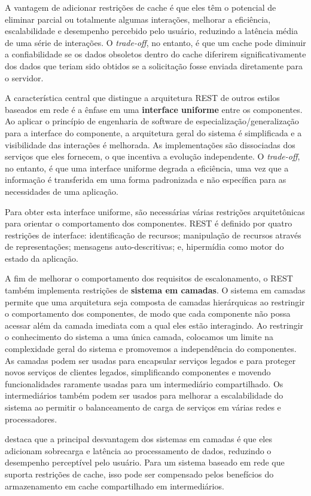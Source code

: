 A vantagem de adicionar restrições de cache é que eles têm o potencial de eliminar parcial ou totalmente algumas interações, melhorar a eficiência, escalabilidade e desempenho percebido pelo usuário, reduzindo a latência média de uma série de interações. O \textit{trade-off}, no entanto, é que um cache pode diminuir a confiabilidade se os dados obsoletos dentro do cache diferirem significativamente dos dados que teriam sido obtidos se a solicitação fosse enviada diretamente para o servidor.

A característica central que distingue a arquitetura REST de outros estilos baseados em rede é a ênfase em uma \textbf{interface uniforme} entre os componentes. Ao aplicar o princípio de engenharia de software de especialização/generalização para a interface do componente, a arquitetura geral do sistema é simplificada e a visibilidade das interações é melhorada. As implementações são dissociadas dos serviços que eles fornecem, o que incentiva a evolução independente. O \textit{trade-off}, no entanto, é que uma interface uniforme degrada a eficiência, uma vez que a informação é transferida em uma forma padronizada e não específica para as necessidades de uma aplicação.

Para obter esta interface uniforme, são necessárias várias restrições arquitetônicas para orientar o comportamento dos componentes. REST é definido por quatro restrições de interface: identificação de recursos; manipulação de recursos através de representações; mensagens auto-descritivas; e, hipermídia como motor do estado da aplicação.

A fim de melhorar o comportamento dos requisitos de escalonamento, o REST também implementa restrições de \textbf{sistema em camadas}. O sistema em camadas permite que uma arquitetura seja composta de camadas hierárquicas ao restringir o comportamento dos componentes, de modo que cada componente não possa acessar além da camada imediata com a qual eles estão interagindo. Ao restringir o conhecimento do sistema a uma única camada, colocamos um limite na complexidade geral do sistema e promovemos a independência do componentes. As camadas podem ser usadas para encapsular serviços legados e para proteger novos serviços de clientes legados, simplificando componentes e movendo funcionalidades raramente usadas para um intermediário compartilhado. Os intermediários também podem ser usados para melhorar a escalabilidade do sistema ao permitir o balanceamento de carga de serviços em várias redes e processadores.

 destaca que a principal desvantagem dos sistemas em camadas é que eles adicionam sobrecarga e latência ao processamento de dados, reduzindo o desempenho perceptível pelo usuário. Para um sistema baseado em rede que suporta restrições de cache, isso pode ser compensado pelos benefícios do armazenamento em cache compartilhado em intermediários.

